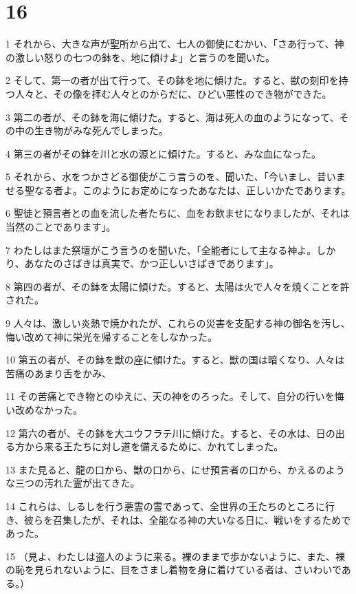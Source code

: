\chapter{16}

\par 1 それから、大きな声が聖所から出て、七人の御使にむかい、「さあ行って、神の激しい怒りの七つの鉢を、地に傾けよ」と言うのを聞いた。
\par 2 そして、第一の者が出て行って、その鉢を地に傾けた。すると、獣の刻印を持つ人々と、その像を拝む人々とのからだに、ひどい悪性のでき物ができた。
\par 3 第二の者が、その鉢を海に傾けた。すると、海は死人の血のようになって、その中の生き物がみな死んでしまった。
\par 4 第三の者がその鉢を川と水の源とに傾けた。すると、みな血になった。
\par 5 それから、水をつかさどる御使がこう言うのを、聞いた、「今いまし、昔いませる聖なる者よ。このようにお定めになったあなたは、正しいかたであります。
\par 6 聖徒と預言者との血を流した者たちに、血をお飲ませになりましたが、それは当然のことであります」。
\par 7 わたしはまた祭壇がこう言うのを聞いた、「全能者にして主なる神よ。しかり、あなたのさばきは真実で、かつ正しいさばきであります」。
\par 8 第四の者が、その鉢を太陽に傾けた。すると、太陽は火で人々を焼くことを許された。
\par 9 人々は、激しい炎熱で焼かれたが、これらの災害を支配する神の御名を汚し、悔い改めて神に栄光を帰することをしなかった。
\par 10 第五の者が、その鉢を獣の座に傾けた。すると、獣の国は暗くなり、人々は苦痛のあまり舌をかみ、
\par 11 その苦痛とでき物とのゆえに、天の神をのろった。そして、自分の行いを悔い改めなかった。
\par 12 第六の者が、その鉢を大ユウフラテ川に傾けた。すると、その水は、日の出る方から来る王たちに対し道を備えるために、かれてしまった。
\par 13 また見ると、龍の口から、獣の口から、にせ預言者の口から、かえるのような三つの汚れた霊が出てきた。
\par 14 これらは、しるしを行う悪霊の霊であって、全世界の王たちのところに行き、彼らを召集したが、それは、全能なる神の大いなる日に、戦いをするためであった。
\par 15 （見よ、わたしは盗人のように来る。裸のままで歩かないように、また、裸の恥を見られないように、目をさまし着物を身に着けている者は、さいわいである。）
